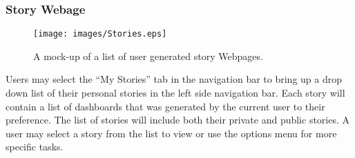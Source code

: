 \documentclass[journal,10pt,onecolumn,compsoc]{IEEEtran}
\begin{document}
    \subsubsection{Story Webage}
    \begin{figure}[H]
        \centering
        \texttt{[image: images/Stories.eps]}
        \caption{A mock-up of a list of user generated story Webpages.}
    \end{figure}
	Users may select the ``My Stories'' tab in the navigation bar to bring up a drop down list of their personal stories in the left side navigation bar.
	Each story will contain a list of dashboards that was generated by the current user to their preference. 
	The list of stories will include both their private and public stories.
	A user may select a story from the list to view or use the options menu for more specific tasks.
	
	
    
    
\end{document}
